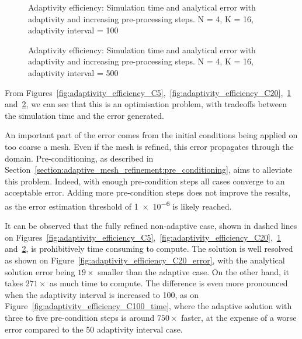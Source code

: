 \begin{figure}[H]
	\centering
	\hfill
	\caption{Adaptivity efficiency: Simulation time and analytical error with adaptivity and increasing pre-processing steps. N = 4, K = 16, adaptivity interval = 100}\label{fig:adaptivity_efficiency_C100}
\end{figure}

\begin{figure}[H]
	\centering
	\hfill
	\caption{Adaptivity efficiency: Simulation time and analytical error with adaptivity and increasing pre-processing steps. N = 4, K = 16, adaptivity interval = 500}\label{fig:adaptivity_efficiency_C500}
\end{figure}

From
Figures~\ref{fig:adaptivity_efficiency_C5},~\ref{fig:adaptivity_efficiency_C20},~\ref{fig:adaptivity_efficiency_C100}
and~\ref{fig:adaptivity_efficiency_C500}, we can see that this is an optimisation problem, with
tradeoffs between the simulation time and the error generated.

An important part of the error comes from the initial conditions being applied on too coarse a mesh.
Even if the mesh is refined, this error propagates through the domain. Pre-conditioning, as
described in Section~\ref{section:adaptive_mesh_refinement:pre_conditioning}, aims to alleviate this
problem. Indeed, with enough pre-condition steps all cases converge to an acceptable error. Adding
more pre-condition steps does not improve the results, as the error estimation threshold of
\num{1e-6} is likely reached.

It can be observed that the fully refined non-adaptive case, shown in dashed lines on
Figures~\ref{fig:adaptivity_efficiency_C5},~\ref{fig:adaptivity_efficiency_C20},~\ref{fig:adaptivity_efficiency_C100}
and~\ref{fig:adaptivity_efficiency_C500}, is prohibitively time consuming to compute. The solution
is well resolved as shown on Figure~\ref{fig:adaptivity_efficiency_C20_error}, with the analytical
solution error being \(19 \times \) smaller than the adaptive case. On the other hand, it takes
\(271 \times \) as much time to compute. The difference is even more pronounced when the adaptivity
interval is increased to 100, as on Figure~\ref{fig:adaptivity_efficiency_C100_time}, where the
adaptive solution with three to five pre-condition steps is around \(750 \times \) faster, at the
expense of a worse error compared to the 50 adaptivity interval case.

